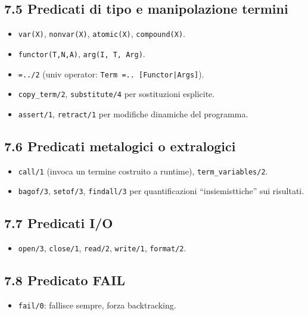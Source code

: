 \documentclass[12pt]{article}
\begin{document}
\subsection*{7.5 Predicati di tipo e manipolazione termini}

\begin{itemize}
  \item \texttt{var(X)}, \texttt{nonvar(X)}, \texttt{atomic(X)}, \texttt{compound(X)}.
  \item \texttt{functor(T,N,A)}, \texttt{arg(I, T, Arg)}.
  \item \texttt{=../2} (univ operator: \texttt{Term =.. [Functor|Args]}).
  \item \texttt{copy\_term/2}, \texttt{substitute/4} per sostituzioni esplicite.
  \item \texttt{assert/1}, \texttt{retract/1} per modifiche dinamiche del programma.
\end{itemize}

\subsection*{7.6 Predicati metalogici o extralogici}

\begin{itemize}
  \item \texttt{call/1} (invoca un termine costruito a runtime), \texttt{term\_variables/2}.
  \item \texttt{bagof/3}, \texttt{setof/3}, \texttt{findall/3} per quantificazioni “insiemisttiche” sui risultati.
\end{itemize}

\subsection*{7.7 Predicati I/O}

\begin{itemize}
  \item \texttt{open/3}, \texttt{close/1}, \texttt{read/2}, \texttt{write/1}, \texttt{format/2}.
\end{itemize}

\subsection*{7.8 Predicato FAIL}

\begin{itemize}
  \item \texttt{fail/0}: fallisce sempre, forza backtracking.
\end{itemize}
\end{document}
